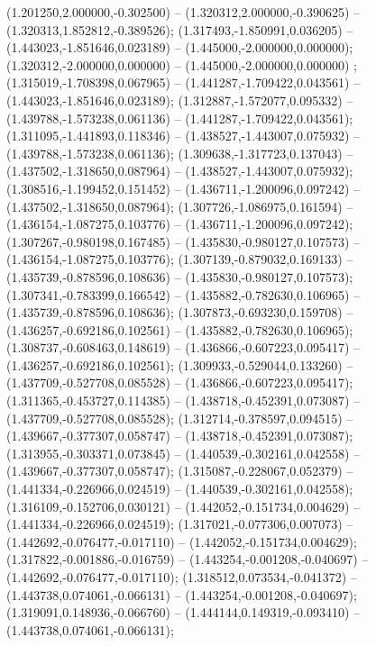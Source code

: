  (1.201250,2.000000,-0.302500) -- (1.320312,2.000000,-0.390625) -- (1.320313,1.852812,-0.389526);
 (1.317493,-1.850991,0.036205) -- (1.443023,-1.851646,0.023189) -- (1.445000,-2.000000,0.000000);
 (1.320312,-2.000000,0.000000) -- (1.445000,-2.000000,0.000000) ;
 (1.315019,-1.708398,0.067965) -- (1.441287,-1.709422,0.043561) -- (1.443023,-1.851646,0.023189);
 (1.312887,-1.572077,0.095332) -- (1.439788,-1.573238,0.061136) -- (1.441287,-1.709422,0.043561);
 (1.311095,-1.441893,0.118346) -- (1.438527,-1.443007,0.075932) -- (1.439788,-1.573238,0.061136);
 (1.309638,-1.317723,0.137043) -- (1.437502,-1.318650,0.087964) -- (1.438527,-1.443007,0.075932);
 (1.308516,-1.199452,0.151452) -- (1.436711,-1.200096,0.097242) -- (1.437502,-1.318650,0.087964);
 (1.307726,-1.086975,0.161594) -- (1.436154,-1.087275,0.103776) -- (1.436711,-1.200096,0.097242);
 (1.307267,-0.980198,0.167485) -- (1.435830,-0.980127,0.107573) -- (1.436154,-1.087275,0.103776);
 (1.307139,-0.879032,0.169133) -- (1.435739,-0.878596,0.108636) -- (1.435830,-0.980127,0.107573);
 (1.307341,-0.783399,0.166542) -- (1.435882,-0.782630,0.106965) -- (1.435739,-0.878596,0.108636);
 (1.307873,-0.693230,0.159708) -- (1.436257,-0.692186,0.102561) -- (1.435882,-0.782630,0.106965);
 (1.308737,-0.608463,0.148619) -- (1.436866,-0.607223,0.095417) -- (1.436257,-0.692186,0.102561);
 (1.309933,-0.529044,0.133260) -- (1.437709,-0.527708,0.085528) -- (1.436866,-0.607223,0.095417);
 (1.311365,-0.453727,0.114385) -- (1.438718,-0.452391,0.073087) -- (1.437709,-0.527708,0.085528);
 (1.312714,-0.378597,0.094515) -- (1.439667,-0.377307,0.058747) -- (1.438718,-0.452391,0.073087);
 (1.313955,-0.303371,0.073845) -- (1.440539,-0.302161,0.042558) -- (1.439667,-0.377307,0.058747);
 (1.315087,-0.228067,0.052379) -- (1.441334,-0.226966,0.024519) -- (1.440539,-0.302161,0.042558);
 (1.316109,-0.152706,0.030121) -- (1.442052,-0.151734,0.004629) -- (1.441334,-0.226966,0.024519);
 (1.317021,-0.077306,0.007073) -- (1.442692,-0.076477,-0.017110) -- (1.442052,-0.151734,0.004629);
 (1.317822,-0.001886,-0.016759) -- (1.443254,-0.001208,-0.040697) -- (1.442692,-0.076477,-0.017110);
 (1.318512,0.073534,-0.041372) -- (1.443738,0.074061,-0.066131) -- (1.443254,-0.001208,-0.040697);
 (1.319091,0.148936,-0.066760) -- (1.444144,0.149319,-0.093410) -- (1.443738,0.074061,-0.066131);
